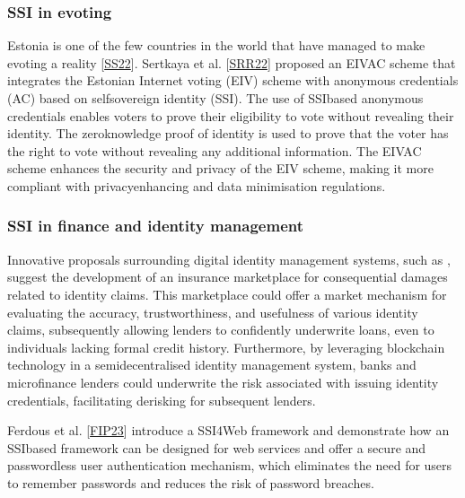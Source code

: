 \documentclass[letterpaper,10pt,english]{jupyterBook}
\begin{document}
\subsubsection{SSI in e\sphinxhyphen{}voting}
\label{\detokenize{SSI/ssi:ssi-in-e-voting}}
\sphinxAtStartPar
Estonia is one of the few countries in the world that have managed to make e\sphinxhyphen{}voting a reality {[}\hyperlink{cite.SSI/ssi:id59}{SS22}{]}. Sertkaya et al. {[}\hyperlink{cite.SSI/ssi:id60}{SRR22}{]} proposed an EIV\sphinxhyphen{}AC scheme that integrates the Estonian Internet voting (EIV) scheme with anonymous credentials (AC) based on self\sphinxhyphen{}sovereign identity (SSI). The use of SSI\sphinxhyphen{}based anonymous credentials enables voters to prove their eligibility to vote without revealing their identity. The zero\sphinxhyphen{}knowledge proof of identity is used to prove that the voter has the right to vote without revealing any additional information. The EIV\sphinxhyphen{}AC scheme enhances the security and privacy of the EIV scheme, making it more compliant with privacy\sphinxhyphen{}enhancing and data minimisation regulations.


\subsubsection{SSI in finance and identity management}
\label{\detokenize{SSI/ssi:ssi-in-finance-and-identity-management}}
\sphinxAtStartPar
Innovative proposals surrounding digital identity management systems, such as , suggest the development of an insurance marketplace for consequential damages related to identity claims. This marketplace could offer a market mechanism for evaluating the accuracy, trustworthiness, and usefulness of various identity claims, subsequently allowing lenders to confidently underwrite loans, even to individuals lacking formal credit history. Furthermore, by leveraging blockchain technology in a semi\sphinxhyphen{}decentralised identity management system, banks and microfinance lenders could underwrite the risk associated with issuing identity credentials, facilitating de\sphinxhyphen{}risking for subsequent lenders.

\sphinxAtStartPar
Ferdous et al. {[}\hyperlink{cite.SSI/ssi:id47}{FIP23}{]} introduce a SSI4Web framework and demonstrate how an SSI\sphinxhyphen{}based framework can be designed for web services and offer a secure and passwordless user authentication mechanism, which eliminates the need for users to remember passwords and reduces the risk of password breaches.
\end{document}
